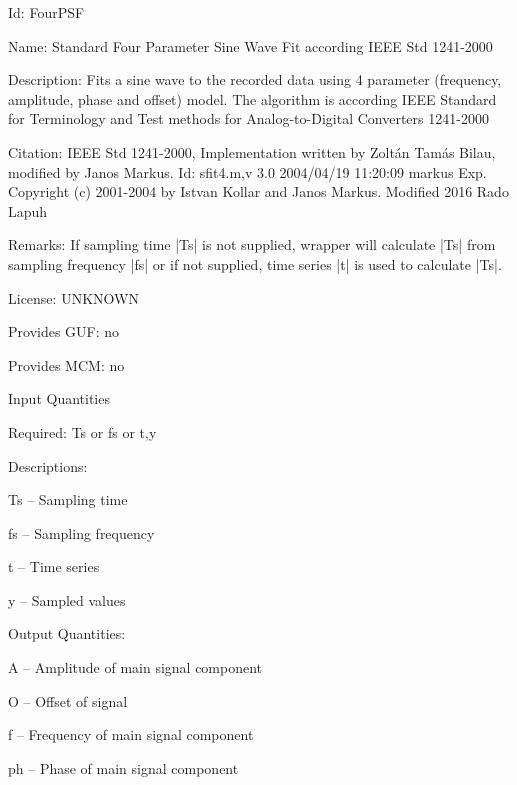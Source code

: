 \begin{tightdesc}
\item [Id:] FourPSF
\item [Name:] Standard Four Parameter Sine Wave Fit according IEEE Std 1241-2000
\item [Description:] Fits a sine wave to the recorded data using 4 parameter (frequency, amplitude, phase and offset) model. The algorithm is according IEEE Standard for Terminology and Test methods for Analog-to-Digital Converters 1241-2000
\item [Citation:] IEEE Std 1241-2000, Implementation written by Zoltán Tamás Bilau, modified by Janos Markus. Id: sfit4.m,v 3.0 2004/04/19 11:20:09 markus Exp. Copyright (c) 2001-2004 by Istvan Kollar and Janos Markus. Modified 2016 Rado Lapuh
\item [Remarks:] If sampling time |Ts| is not supplied, wrapper will calculate |Ts| from sampling frequency |fs| or if not supplied, time series |t| is used to calculate |Ts|.
\item [License:] UNKNOWN
\item [Provides GUF:] no
\item [Provides MCM:] no
\item [Input Quantities] \rule{0em}{0em}
    \begin{tightdesc}
    \item [Required:] 
        \textsf{Ts} or \textsf{fs} or \textsf{t},\enspace \textsf{y}
    \item [Descriptions:] \rule{0em}{0em}
        \begin{tightdesc}
            \item[\textsf{Ts}] -- Sampling time
            \item[\textsf{fs}] -- Sampling frequency
            \item[\textsf{t}] -- Time series
            \item[\textsf{y}] -- Sampled values
        \end{tightdesc}
    \end{tightdesc}
\item [Output Quantities:] \rule{0em}{0em}
    \begin{tightdesc}
        \item[\textsf{A}] -- Amplitude of main signal component
        \item[\textsf{O}] -- Offset of signal
        \item[\textsf{f}] -- Frequency of main signal component
        \item[\textsf{ph}] -- Phase of main signal component
    \end{tightdesc}
\end{tightdesc}
